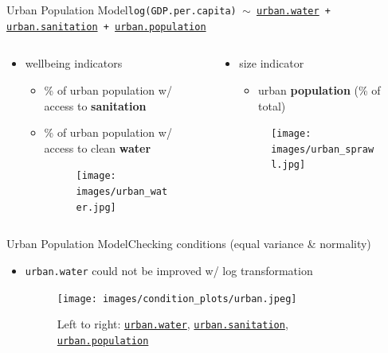 \documentclass{beamer}
\begin{document}
\begin{frame}{{\sc Urban Population} Model}{\tt log(GDP.per.capita) $\sim$ \href{http://data.worldbank.org/indicator/SH.H2O.SAFE.UR.ZS}{urban.water} + \href{http://data.worldbank.org/indicator/SH.STA.ACSN.UR}{urban.sanitation} + \href{http://data.worldbank.org/indicator/SP.URB.TOTL.IN.ZS}{urban.population}}
  \begin{columns}
    \begin{column}{0.5\textwidth}
      \begin{itemize}
      \item wellbeing indicators
	\begin{itemize}
	\item \% of urban population w/ access to {\bf sanitation}
	\item \% of urban population w/ access to clean {\bf water}
	  \begin{figure}
	    \centering
	    \texttt{[image: images/urban\_water.jpg]}
	  \end{figure}
	\end{itemize}
      \end{itemize}
    \end{column}
    
    \begin{column}{0.5\textwidth}
      \begin{itemize}
      \item size indicator
        \begin{itemize}
        \item urban {\bf population} (\% of total)
        \end{itemize}
        \begin{figure}
	  \centering
	  \texttt{[image: images/urban\_sprawl.jpg]}
	\end{figure}
      \end{itemize}
    \end{column}
  \end{columns}
\end{frame}


\begin{frame}{{\sc Urban Population} Model}{Checking conditions (equal variance \& normality)}
  \begin{itemize}
  \item {\tt urban.water} could not be improved w/ log transformation
    \begin{figure}
      \centering
      \texttt{[image: images/condition\_plots/urban.jpeg]}
      \caption{Left to right: \href{http://data.worldbank.org/indicator/SH.H2O.SAFE.UR.ZS}{\tt urban.water}, \href{http://data.worldbank.org/indicator/SH.STA.ACSN.UR}{\tt urban.sanitation}, \href{http://data.worldbank.org/indicator/SP.URB.TOTL.IN.ZS}{\tt urban.population}}
    \end{figure}
  \end{itemize}
\end{frame}
\end{document}
